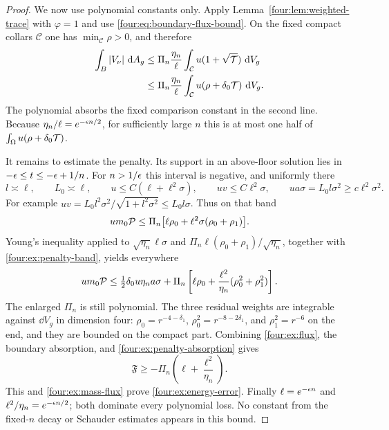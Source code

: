 \begin{proof}
We now use polynomial constants only.  Apply
Lemma~\ref{four:lem:weighted-trace} with $\varphi=1$ and use
\eqref{four:eq:boundary-flux-bound}.  On the fixed compact collars
$\mathcal C$ one has $\min_{\mathcal C}\rho>0$, and therefore
\[
 \begin{split}
 \int_B|V_\nu|\,\,\mathrm d A_g
 &\le\Pi_n\frac{\eta_n}{\ell}
       \int_{\mathcal C}u(1+\sqrt{\mathcal T})\,\,\mathrm d V_g\\
 &\le\Pi_n\frac{\eta_n}{\ell}
       \int_{\mathcal C}u(\rho+\delta_0\mathcal T)\,\,\mathrm d V_g.
 \end{split}
\]
The polynomial absorbs the fixed comparison constant in the second
line.  Because $\eta_n/\ell=e^{-\epsilon n/2}$, for sufficiently large
$n$ this is at most one half of
$\int_\Omega u(\rho+\delta_0\mathcal T)$.

It remains to estimate the penalty.  Its support in an above-floor
solution lies in
$-\epsilon\le t\le-\epsilon+1/n$.  For $n>1/\epsilon$ this interval is negative,
and uniformly there
\begin{equation}\label{four:ex:penalty-band}
 l\asymp\ell,\qquad L_0\asymp\ell,\qquad
 u\le C(\ell+\ell^2\sigma),\qquad
 uv\le C\ell^2\sigma,\qquad
 ua\sigma=L_0l\sigma^2\ge c\ell^2\sigma^2.
\end{equation}
For example $uv=L_0l^2\sigma^2/\sqrt{1+l^2\sigma^2}
\le L_0l\sigma$.  Thus on that band
\[
 um_0\mathcal P\le\Pi_n\bigl[\ell\rho_0+
                         \ell^2\sigma(\rho_0+\rho_1)\bigr].
\]
Young's inequality applied to
$\sqrt{\eta_n}\ell\sigma$ and
$\Pi_n\ell(\rho_0+\rho_1)/\sqrt{\eta_n}$, together with
\eqref{four:ex:penalty-band}, yields everywhere
\begin{equation}\label{four:ex:penalty-absorption}
 um_0\mathcal P\le\tfrac12\delta_0u\eta_n a\sigma
   +\Pi_n\left[\ell\rho_0+
       \frac{\ell^2}{\eta_n}(\rho_0^2+\rho_1^2)\right].
\end{equation}
The enlarged $\Pi_n$ is still polynomial.  The three residual weights
are integrable against $\dd V_g$ in dimension four:
$\rho_0=r^{-4-\delta_1}$, $\rho_0^2=r^{-8-2\delta_1}$, and
$\rho_1^2=r^{-6}$ on the end, and they are bounded on the compact part.
Combining \eqref{four:ex:flux}, the boundary absorption, and
\eqref{four:ex:penalty-absorption} gives
\[
 \mathfrak F\ge-\Pi_n\left(\ell+\frac{\ell^2}{\eta_n}\right).
\]
This and \eqref{four:ex:mass-flux} prove \eqref{four:ex:energy-error}.
Finally $\ell=e^{-\epsilon n}$ and $\ell^2/\eta_n=e^{-\epsilon n/2}$;
both dominate every polynomial loss.  No constant from the fixed-$n$
decay or Schauder estimates appears in this bound.
\end{proof}

